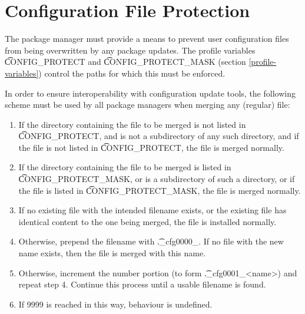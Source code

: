 \chapter{Configuration File Protection}
\label{config-protect}

The package manager must provide a means to prevent user configuration files from being
overwritten by any package updates. The profile variables \t{CONFIG\_PROTECT} and
\t{CONFIG\_PROTECT\_MASK} (section \ref{profile-variables}) control the paths for which this
must be enforced.

In order to ensure interoperability with configuration update tools, the following scheme must be
used by all package managers when merging any (regular) file:

\begin{enumerate}
\item If the directory containing the file to be merged is not listed in \t{CONFIG\_PROTECT}, and
     is not a subdirectory of any such directory, and if the file is not listed in \t{CONFIG\_PROTECT},
     the file is merged normally.
\item If the directory containing the file to be merged is listed in \t{CONFIG\_PROTECT\_MASK}, or
    is a subdirectory of such a directory, or if the file is listed in \t{CONFIG\_PROTECT\_MASK},
    the file is merged normally.
\item If no existing file with the intended filename exists, or the existing file has identical
    content to the one being merged, the file is installed normally.
\item Otherwise, prepend the filename with \t{.\_cfg0000\_}. If no file with the new name exists,
    then the file is merged with this name.
\item Otherwise, increment the number portion (to form \t{.\_cfg0001\_<name>}) and repeat step 4.
    Continue this process until a usable filename is found.
\item If 9999 is reached in this way, behaviour is undefined.
\end{enumerate}

